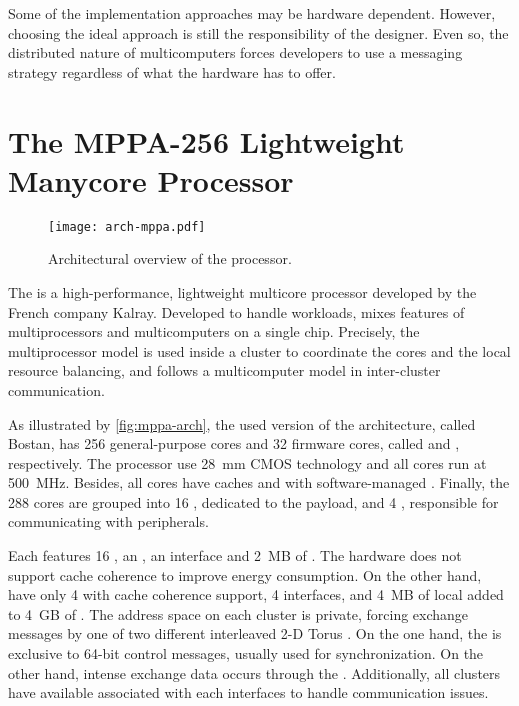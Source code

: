 				Some of the implementation approaches may be hardware dependent.
				However, choosing the ideal approach is still the responsibility of the \os designer.
				Even so, the distributed nature of multicomputers forces developers to
				use a messaging strategy regardless of what the hardware has to offer.

\section{The MPPA-256 Lightweight Manycore Processor}
\label{sec.mppa}

	\begin{figure}[t]
		\centering%
		\caption{Architectural overview of the \mppa processor.}%
		\label{fig:mppa-arch}%
		\texttt{[image: arch-mppa.pdf]}%
	\end{figure}

	The \mppa is a high-performance, lightweight multicore processor
	developed by the French company Kalray.
	Developed to handle \mimd workloads, \mppa mixes features of
	multiprocessors and multicomputers on a single chip.
	Precisely, the multiprocessor model is used inside a cluster
	to coordinate the cores and the local resource balancing, and
	follows a multicomputer model in inter-cluster communication.

	As illustrated by \autoref{fig:mppa-arch},
	the used version of
	the architecture, called Bostan, has 256 general-purpose cores and
	32 firmware cores, called \pes and \rms, respectively.
	The processor use 28~mm CMOS technology and all cores run at 500~MHz.
	Besides, all cores have caches and \mmus with software-managed \tlbs.
	Finally, the 288 cores are grouped into 16 \cclusters, dedicated to
	the payload, and 4 \ioclusters, responsible for communicating with peripherals.

	Each \ccluster features 16 \pes, an \rm, an \noc interface and 2~MB of \sram.
	The hardware does not support cache coherence to improve energy consumption.
	On the other hand, \ioclusters have only 4 \rms with cache coherence support,
	4 \noc interfaces, and 4~MB of local \sram added to 4~GB of \dram.
	The address space on each cluster is private, forcing exchange messages
	by one of two different interleaved 2-D Torus \nocs.
	On the one hand, the \cnoc is exclusive to 64-bit control messages,
	usually used for synchronization.
	On the other hand, intense exchange data occurs through the \dnoc.
	Additionally, all clusters have available \dmas associated with each
	\noc interfaces to handle communication issues.

